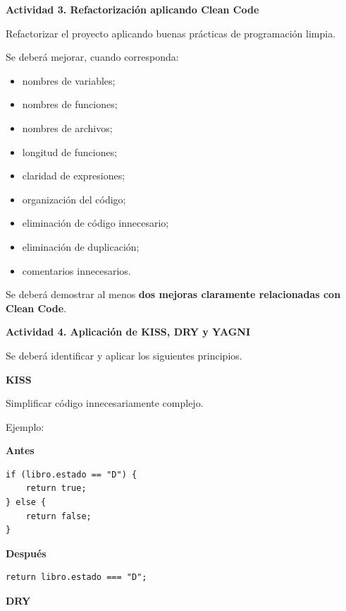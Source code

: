 \documentclass[12pt,letterpaper]{article}
\begin{document}
\vspace{8pt}

\noindent\textbf{Actividad 3. Refactorizaci\'on aplicando Clean Code}

\vspace{2pt}
Refactorizar el proyecto aplicando buenas pr\'acticas de programaci\'on limpia.

Se deber\'a mejorar, cuando corresponda:

\begin{itemize}[leftmargin=1.27cm, label=\textbullet, topsep=1pt, itemsep=0pt, parsep=0pt]
  \item nombres de variables;
  \item nombres de funciones;
  \item nombres de archivos;
  \item longitud de funciones;
  \item claridad de expresiones;
  \item organizaci\'on del c\'odigo;
  \item eliminaci\'on de c\'odigo innecesario;
  \item eliminaci\'on de duplicaci\'on;
  \item comentarios innecesarios.
\end{itemize}

Se deber\'a demostrar al menos \textbf{dos mejoras claramente relacionadas con Clean Code}.

\vspace{8pt}

\noindent\textbf{Actividad 4. Aplicaci\'on de KISS, DRY y YAGNI}

\vspace{2pt}
Se deber\'a identificar y aplicar los siguientes principios.

\vspace{4pt}
\textbf{KISS}

Simplificar c\'odigo innecesariamente complejo.

Ejemplo:

\textbf{Antes}
\begin{lstlisting}
if (libro.estado == "D") {
    return true;
} else {
    return false;
}
\end{lstlisting}

\textbf{Despu\'es}
\begin{lstlisting}
return libro.estado === "D";
\end{lstlisting}

\vspace{4pt}
\textbf{DRY}
\end{document}
